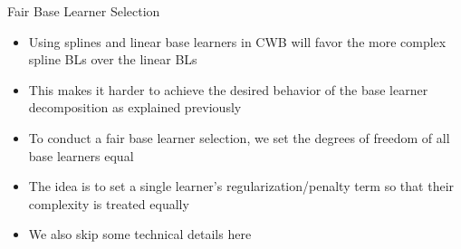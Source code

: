 \documentclass[11pt,compress,t,notes=noshow, xcolor=table]{beamer}
\begin{document}
\begin{vbframe}{Fair Base Learner Selection}

\begin{itemize} \setlength{\itemsep}{1.6em}

  \item
    Using splines and linear base learners in CWB will favor
    the more complex spline BLs over the linear BLs

  \item
    This makes it harder to achieve the desired behavior of the base learner
    decomposition as explained previously

  \item
    To conduct a fair base learner selection, we set the degrees of freedom of all base learners equal

  \item
    The idea is to set a single learner's regularization/penalty term so that their complexity is treated equally

\item We also skip some technical details here

\end{itemize}

\framebreak








\end{vbframe}
\end{document}
